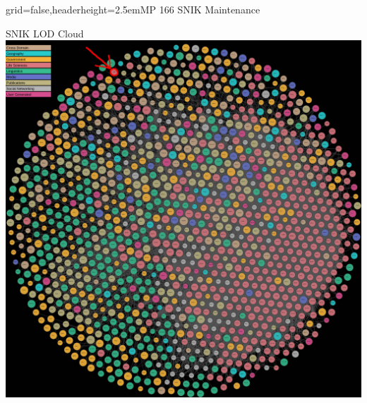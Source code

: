 \documentclass[english]{kiesgrube}
\begin{document}
\newpage

\begin{poster}{grid=false,headerheight=2.5em}{}{MP 166 SNIK Maintenance}{}{}
\begin{posterbox}[name=lodcloud,column=0,row=0]{SNIK LOD Cloud}
\vspace{0.2em}
\centering\includegraphics[width=1.0\textwidth,height=0.95\textheight,keepaspectratio]{img/lod-cloud.jpg}
\end{posterbox}
\end{poster}
\end{document}
